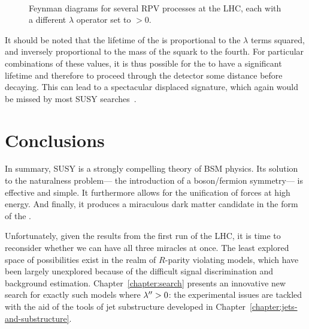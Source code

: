 

\begin{figure}
\centering
{}
\\
\label{fig:susy:rpv_diagrams}
\caption{Feynman diagrams for several RPV processes at the LHC, each with a different $\lambda$ operator set to $>0$.}
\end{figure}


It should be noted that the lifetime of the \lsp is proportional to the $\lambda$ terms squared, and inversely proportional to the mass of the squark to the fourth. For particular combinations of these values, it is thus possible for the \lsp to have a significant lifetime and therefore to proceed through the detector some distance before decaying. This can lead to a spectacular displaced signature, which again would be missed by most SUSY searches~\cite{Graham:2012th}. 


\section{Conclusions}

In summary, SUSY is a strongly compelling theory of BSM physics. Its solution to the naturalness problem--- the introduction of a boson/fermion symmetry--- is effective and simple. It furthermore allows for the unification of forces at high energy. And finally, it produces a miraculous dark matter candidate in the form of the \lsp.

Unfortunately, given the results from the first run of the LHC, it is time to reconsider whether we can have all three miracles at once. The least explored space of possibilities exist in the realm of $R$-parity violating models, which have been largely unexplored because of the difficult signal discrimination and background estimation. Chapter~\ref{chapter:search} presents an innovative new search for exactly such models where $\lambda^{\prime\prime} > 0$: the experimental issues are tackled with the aid of the tools of jet substructure developed in Chapter~\ref{chapter:jets-and-substructure}.